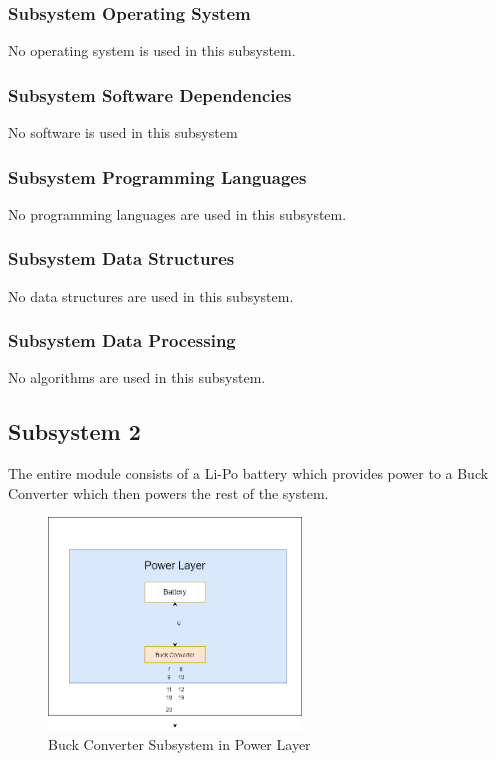 \subsubsection{Subsystem Operating System}
No operating system is used in this subsystem.

\subsubsection{Subsystem Software Dependencies}
No software is used in this subsystem

\subsubsection{Subsystem Programming Languages}
No programming languages are used in this subsystem.

\subsubsection{Subsystem Data Structures}
No data structures are used in this subsystem.

\subsubsection{Subsystem Data Processing}
No algorithms are used in this subsystem.

\subsection{Subsystem 2}
The entire module consists of a Li-Po battery which provides power to a Buck Converter which then powers the rest of the system. 

\begin{figure}[h!]
	\centering
 	\includegraphics[width=0.60\textwidth]{images/Buck.png} %
 \caption{Buck Converter Subsystem in Power Layer} %
\end{figure}

